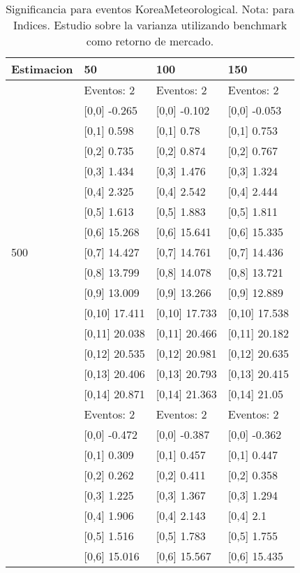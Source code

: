 \begin{table}

\caption{Significancia para eventos KoreaMeteorological. Nota: para Indices. Estudio sobre la varianza utilizando benchmark como retorno de mercado.}
\centering
\begin{tabular}[t]{llll}
\toprule
Estimacion & 50 & 100 & 150\\
\midrule
 & Eventos:  2 & Eventos:  2 & Eventos:  2\\
 & {}[0,0] -0.265 & {}[0,0] -0.102 & {}[0,0] -0.053\\
 & {}[0,1] 0.598 & {}[0,1] 0.78 & {}[0,1] 0.753\\
 & {}[0,2] 0.735 & {}[0,2] 0.874 & {}[0,2] 0.767\\
 & {}[0,3] 1.434 & {}[0,3] 1.476 & {}[0,3] 1.324\\
\addlinespace
 & {}[0,4] 2.325 & {}[0,4] 2.542 & {}[0,4] 2.444\\
 & {}[0,5] 1.613 & {}[0,5] 1.883 & {}[0,5] 1.811\\
 & {}[0,6] 15.268 & {}[0,6] 15.641 & {}[0,6] 15.335\\
500 & {}[0,7] 14.427 & {}[0,7] 14.761 & {}[0,7] 14.436\\
 & {}[0,8] 13.799 & {}[0,8] 14.078 & {}[0,8] 13.721\\
\addlinespace
 & {}[0,9] 13.009 & {}[0,9] 13.266 & {}[0,9] 12.889\\
 & {}[0,10] 17.411 & {}[0,10] 17.733 & {}[0,10] 17.538\\
 & {}[0,11] 20.038 & {}[0,11] 20.466 & {}[0,11] 20.182\\
 & {}[0,12] 20.535 & {}[0,12] 20.981 & {}[0,12] 20.635\\
 & {}[0,13] 20.406 & {}[0,13] 20.793 & {}[0,13] 20.415\\
\addlinespace
 & {}[0,14] 20.871 & {}[0,14] 21.363 & {}[0,14] 21.05\\
 & Eventos:  2 & Eventos:  2 & Eventos:  2\\
 & {}[0,0] -0.472 & {}[0,0] -0.387 & {}[0,0] -0.362\\
 & {}[0,1] 0.309 & {}[0,1] 0.457 & {}[0,1] 0.447\\
 & {}[0,2] 0.262 & {}[0,2] 0.411 & {}[0,2] 0.358\\
\addlinespace
 & {}[0,3] 1.225 & {}[0,3] 1.367 & {}[0,3] 1.294\\
 & {}[0,4] 1.906 & {}[0,4] 2.143 & {}[0,4] 2.1\\
 & {}[0,5] 1.516 & {}[0,5] 1.783 & {}[0,5] 1.755\\
 & {}[0,6] 15.016 & {}[0,6] 15.567 & {}[0,6] 15.435\\

\end{tabular}
\end{table}
